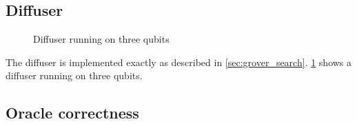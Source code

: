 \documentclass[11pt]{article}
\theoremstyle{definition}
\theoremstyle{remark}
\begin{document}
\subsection{Diffuser}

\begin{figure}
  \centering
  
  \caption{Diffuser running on three qubits}
  \label{fig:diffuser_3}
\end{figure}

The diffuser is implemented exactly as described in
\cref{sec:grover_search}. \cref{fig:diffuser_3} shows a diffuser running on
three qubits.

\subsection{Oracle correctness} \label{proof:oracle_correctness}
\end{document}

